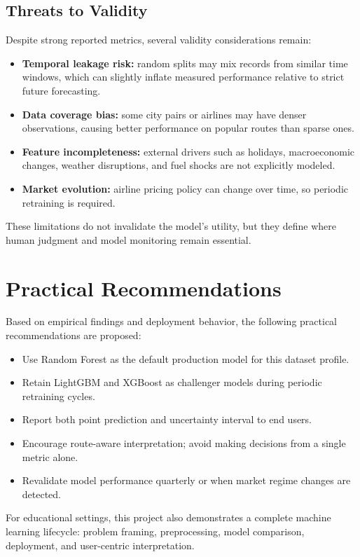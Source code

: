 \documentclass[conference]{IEEEtran}
\begin{document}
\subsection{Threats to Validity}
Despite strong reported metrics, several validity considerations remain:
\begin{itemize}
\item \textbf{Temporal leakage risk:} random splits may mix records from similar time windows, which can slightly inflate measured performance relative to strict future forecasting.
\item \textbf{Data coverage bias:} some city pairs or airlines may have denser observations, causing better performance on popular routes than sparse ones.
\item \textbf{Feature incompleteness:} external drivers such as holidays, macroeconomic changes, weather disruptions, and fuel shocks are not explicitly modeled.
\item \textbf{Market evolution:} airline pricing policy can change over time, so periodic retraining is required.
\end{itemize}

These limitations do not invalidate the model's utility, but they define where human judgment and model monitoring remain essential.

\section{Practical Recommendations}
Based on empirical findings and deployment behavior, the following practical recommendations are proposed:
\begin{itemize}
\item Use Random Forest as the default production model for this dataset profile.
\item Retain LightGBM and XGBoost as challenger models during periodic retraining cycles.
\item Report both point prediction and uncertainty interval to end users.
\item Encourage route-aware interpretation; avoid making decisions from a single metric alone.
\item Revalidate model performance quarterly or when market regime changes are detected.
\end{itemize}

For educational settings, this project also demonstrates a complete machine learning lifecycle: problem framing, preprocessing, model comparison, deployment, and user-centric interpretation.
\end{document}
